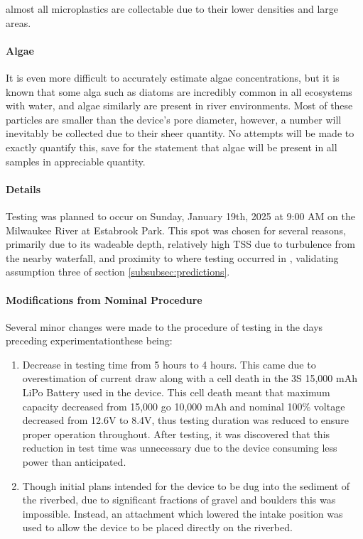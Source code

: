 \documentclass[fleqn,10pt]{SelfArx} %
\begin{document}
almost all microplastics are collectable due to their lower densities and large areas.
	\paragraph{Algae}
	It is even more difficult to accurately estimate algae concentrations, but it is known that some alga such as diatoms are incredibly common in all ecosystems with water, and algae similarly are present in river environments. Most of these particles are smaller than the device's pore diameter, however, a number will inevitably be collected due to their sheer quantity. No attempts will be made to exactly quantify this, save for the statement that algae will be present in all samples in appreciable quantity. 
	\paragraph*{Details}
	Testing was planned to occur on Sunday, January 19th, 2025 at 9:00 AM on the Milwaukee River at Estabrook Park. This spot was chosen for several reasons, primarily due to its wadeable depth, relatively high TSS due to turbulence from the nearby waterfall, and proximity to where testing occurred in \cite{LenakerEtAlvertdist}, validating assumption three of section \ref{subsubsec:predictions}. 
	\paragraph*{Modifications from Nominal Procedure}
	\label{sec:mods}
	Several minor changes were made to the procedure of testing in the days preceding experimentation\textemdash these being:
	\begin{enumerate}
		\item Decrease in testing time from 5 hours to 4 hours. This came due to overestimation of current draw along with a cell death in the 3S 15,000 mAh LiPo Battery used in the device. This cell death meant that maximum capacity decreased from 15,000 go 10,000 mAh and nominal 100\% voltage decreased from 12.6V to 8.4V, thus testing duration was reduced to ensure proper operation throughout. After testing, it was discovered that this reduction in test time was unnecessary due to the device consuming less power than anticipated. 
		\item Though initial plans intended for the device to be dug into the sediment of the riverbed, due to significant fractions of gravel and boulders this was impossible. Instead, an attachment which lowered the intake position was used to allow the device to be placed directly on the riverbed. 
	\end{enumerate}
\end{document}
